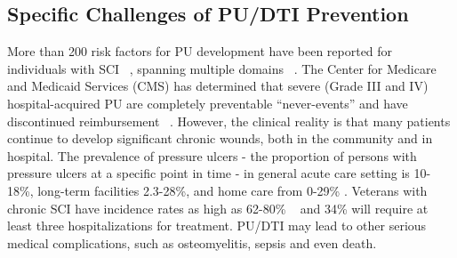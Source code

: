 \documentclass{amia}
\begin{document}


\subsection{Specific Challenges of PU/DTI Prevention}

More than 200 risk factors for PU development have been reported for individuals with SCI ~\cite{risk-factors-number}, spanning multiple domains ~\cite{risk-factors-domain}. The Center for Medicare and Medicaid Services (CMS) has determined that severe (Grade III and IV) hospital-acquired PU are completely preventable ``never-events'' and have discontinued reimbursement ~\cite{never-event}. However, the clinical reality is that many patients continue to develop significant chronic wounds, both in the community and in hospital. The prevalence of pressure ulcers - the proportion of persons with pressure ulcers at a specific point in time - in general acute care setting is 10-18\%, long-term facilities 2.3-28\%, and home care from 0-29\% \cite{ac-rate-ir, ac-rate-pr}. Veterans with chronic SCI have incidence rates as high as 62-80\% ~\cite{va-pr-up, va-pr-bot} and 34\% will require at least three hospitalizations for treatment. PU/DTI may lead to other serious medical complications, such as osteomyelitis, sepsis and even death.
\end{document}
